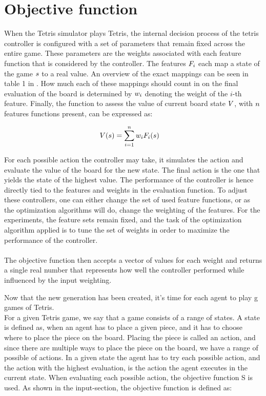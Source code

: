 \section{Objective function}

When the Tetris simulator plays Tetris, the internal decision process
of the tetris controller is configured with a set of parameters that remain
fixed across the entire game. These parameters are the weights associated 
with each feature function that is considered by the controller. The features $F _{i}$
each map a state of the game $s$ to a real value. An overview of the exact mappings
can be seen in table 1 in \citep{scherrer2009:b}. How much each of these mappings
should count in on the final evaluation of the board is determined by $w _{i}$
denoting the weight of the $i$-th feature. Finally, the function to assess the value 
of current board state $V$, with $n$ features functions present, can be expressed as:

\begin{align*}
V (s ) &= \sum_{i=1}^{n} w _{i}F _{i}(s )
\end{align*}

For each possible action the controller may take, it simulates 
the action and evaluate the value of the board for the new state. 
The final action is the one that yields the state of the highest value.
The performance of the controller is hence directly tied to the 
features and weights in the evaluation function. To adjust these controllers,
one can either change the set of used feature functions, or as the 
optimization algorithms will do, change the weighting of the features.
For the experiments, the feature sets remain fixed, and the task of the
optimization algorithm applied is to tune the set of weights in order 
to maximize the performance of the controller.\\
\\
The objective function then accepts a vector of values for each weight
and returns a single real number that represents how well the controller
performed while influenced by the input weighting.




Now that the new generation has been created, it's time for each agent to play g games of Tetris.\\
For a given Tetris game, we say that a game consists of a range of states. A state is defined as, when an agent has to place a given piece, and it has to choose where to place the piece on the board. Placing the piece is called an action, and since there are multiple ways to place the piece on the board, we have a range of possible of actions. In a given state the agent has to try each possible action, and the action with the highest evaluation, is the action the agent executes in the current state. 
When evaluating each possible action, the objective function S is used. As shown in the input-section, the objective function is defined as:

